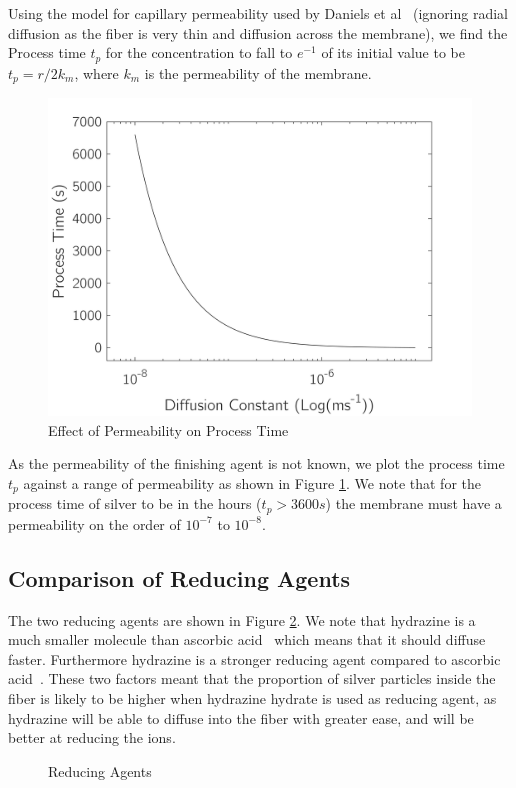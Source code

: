 \documentclass[a4paper, oneside]{discothesis}
\begin{document}
Using the model for capillary permeability used by Daniels et al~\cite{capillary_diffusion} (ignoring radial diffusion as the fiber is very thin and diffusion across the membrane), we find the Process time $t_p$ for the concentration to fall to $e^{-1}$ of its initial value to be $t_p = r/2k_m$, where $k_m$ is the permeability of the membrane.

\begin{figure}[ht]
    \centering
    \includegraphics[width=.6\textwidth, keepaspectratio]{figures/diff_time.png}
    \caption{Effect of Permeability on Process Time}
    \label{perm_process}
\end{figure}

As the permeability of the finishing agent is not known, we plot the process time $t_p$ against a range of permeability as shown in Figure \ref{perm_process}. We note that for the process time of silver to be in the hours ($t_p > 3600s$) the membrane must have a permeability on the order of $10^{-7}$ to $10^{-8}$.

\pagebreak
\subsection{Comparison of Reducing Agents}
The two reducing agents are shown in Figure \ref{reducing_agents}. We note that hydrazine is a much smaller molecule than ascorbic acid~\cite{size_hydrazine,size_ascorbic} which means that it should diffuse faster. Furthermore hydrazine is a stronger reducing agent compared to ascorbic acid~\cite{kinetics_hydrazine,kinetics_ascorbic}.
These two factors meant that the proportion of silver particles inside the fiber is likely to be higher when hydrazine hydrate is used as reducing agent, as hydrazine will be able to diffuse into the fiber with greater ease, and will be better at reducing the  ions.

\begin{figure}[ht]
    \centering
    \qquad
    \caption{Reducing Agents}%
    \label{reducing_agents}%
\end{figure}
\end{document}
